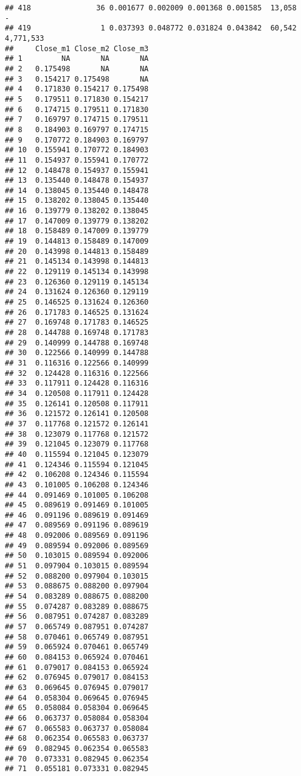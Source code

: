 \documentclass[]{article}
\begin{document}
\begin{verbatim}
## 418               36 0.001677 0.002009 0.001368 0.001585  13,058         -
## 419                1 0.037393 0.048772 0.031824 0.043842  60,542 4,771,533
##     Close_m1 Close_m2 Close_m3
## 1         NA       NA       NA
## 2   0.175498       NA       NA
## 3   0.154217 0.175498       NA
## 4   0.171830 0.154217 0.175498
## 5   0.179511 0.171830 0.154217
## 6   0.174715 0.179511 0.171830
## 7   0.169797 0.174715 0.179511
## 8   0.184903 0.169797 0.174715
## 9   0.170772 0.184903 0.169797
## 10  0.155941 0.170772 0.184903
## 11  0.154937 0.155941 0.170772
## 12  0.148478 0.154937 0.155941
## 13  0.135440 0.148478 0.154937
## 14  0.138045 0.135440 0.148478
## 15  0.138202 0.138045 0.135440
## 16  0.139779 0.138202 0.138045
## 17  0.147009 0.139779 0.138202
## 18  0.158489 0.147009 0.139779
## 19  0.144813 0.158489 0.147009
## 20  0.143998 0.144813 0.158489
## 21  0.145134 0.143998 0.144813
## 22  0.129119 0.145134 0.143998
## 23  0.126360 0.129119 0.145134
## 24  0.131624 0.126360 0.129119
## 25  0.146525 0.131624 0.126360
## 26  0.171783 0.146525 0.131624
## 27  0.169748 0.171783 0.146525
## 28  0.144788 0.169748 0.171783
## 29  0.140999 0.144788 0.169748
## 30  0.122566 0.140999 0.144788
## 31  0.116316 0.122566 0.140999
## 32  0.124428 0.116316 0.122566
## 33  0.117911 0.124428 0.116316
## 34  0.120508 0.117911 0.124428
## 35  0.126141 0.120508 0.117911
## 36  0.121572 0.126141 0.120508
## 37  0.117768 0.121572 0.126141
## 38  0.123079 0.117768 0.121572
## 39  0.121045 0.123079 0.117768
## 40  0.115594 0.121045 0.123079
## 41  0.124346 0.115594 0.121045
## 42  0.106208 0.124346 0.115594
## 43  0.101005 0.106208 0.124346
## 44  0.091469 0.101005 0.106208
## 45  0.089619 0.091469 0.101005
## 46  0.091196 0.089619 0.091469
## 47  0.089569 0.091196 0.089619
## 48  0.092006 0.089569 0.091196
## 49  0.089594 0.092006 0.089569
## 50  0.103015 0.089594 0.092006
## 51  0.097904 0.103015 0.089594
## 52  0.088200 0.097904 0.103015
## 53  0.088675 0.088200 0.097904
## 54  0.083289 0.088675 0.088200
## 55  0.074287 0.083289 0.088675
## 56  0.087951 0.074287 0.083289
## 57  0.065749 0.087951 0.074287
## 58  0.070461 0.065749 0.087951
## 59  0.065924 0.070461 0.065749
## 60  0.084153 0.065924 0.070461
## 61  0.079017 0.084153 0.065924
## 62  0.076945 0.079017 0.084153
## 63  0.069645 0.076945 0.079017
## 64  0.058304 0.069645 0.076945
## 65  0.058084 0.058304 0.069645
## 66  0.063737 0.058084 0.058304
## 67  0.065583 0.063737 0.058084
## 68  0.062354 0.065583 0.063737
## 69  0.082945 0.062354 0.065583
## 70  0.073331 0.082945 0.062354
## 71  0.055181 0.073331 0.082945

\end{verbatim}
\end{document}
